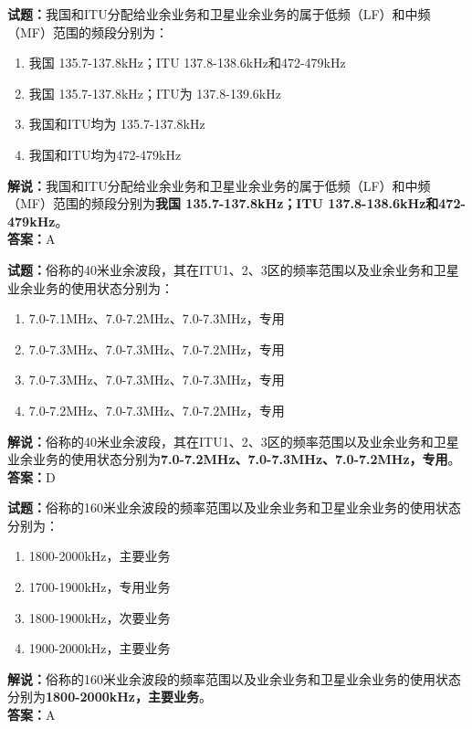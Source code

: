 \documentclass{ctexbook}
\begin{document}
\vspace{\baselineskip}

\noindent\textbf{试题：}我国和ITU分配给业余业务和卫星业余业务的属于低频（LF）和中频（MF）范围的频段分别为：
\begin{enumerate}[leftmargin=3em]
  \item 我国 135.7-137.8\unit{\kHz}；ITU 137.8-138.6\unit{\kHz}和472-479\unit{\kHz}
  \item 我国 135.7-137.8\unit{\kHz}；ITU为 137.8-139.6\unit{\kHz}
  \item 我国和ITU均为 135.7-137.8\unit{\kHz}
  \item 我国和ITU均为472-479\unit{\kHz}
\end{enumerate}
\noindent\textbf{解说：}我国和ITU分配给业余业务和卫星业余业务的属于低频（LF）和中频（MF）范围的频段分别为\textbf{我国 135.7-137.8\unit{\kHz}；ITU 137.8-138.6\unit{\kHz}和472-479\unit{\kHz}}。\\\noindent\textbf{答案：}A

\vspace{\baselineskip}

\noindent\textbf{试题：}俗称的40米业余波段，其在ITU1、2、3区的频率范围以及业余业务和卫星业余业务的使用状态分别为：
\begin{enumerate}[leftmargin=3em]
  \item 7.0-7.1\unit{\MHz}、7.0-7.2\unit{\MHz}、7.0-7.3\unit{\MHz}，专用
  \item 7.0-7.3\unit{\MHz}、7.0-7.3\unit{\MHz}、7.0-7.2\unit{\MHz}，专用
  \item 7.0-7.3\unit{\MHz}、7.0-7.3\unit{\MHz}、7.0-7.3\unit{\MHz}，专用
  \item 7.0-7.2\unit{\MHz}、7.0-7.3\unit{\MHz}、7.0-7.2\unit{\MHz}，专用
\end{enumerate}
\noindent\textbf{解说：}俗称的40米业余波段，其在ITU1、2、3区的频率范围以及业余业务和卫星业余业务的使用状态分别为\textbf{7.0-7.2\unit{\MHz}、7.0-7.3\unit{\MHz}、7.0-7.2\unit{\MHz}，专用}。\\\noindent\textbf{答案：}D

\vspace{\baselineskip}

\noindent\textbf{试题：}俗称的160米业余波段的频率范围以及业余业务和卫星业余业务的使用状态分别为：
\begin{enumerate}[leftmargin=3em]
  \item 1800-2000\unit{\kHz}，主要业务
  \item 1700-1900\unit{\kHz}，专用业务
  \item 1800-1900\unit{\kHz}，次要业务
  \item 1900-2000\unit{\kHz}，主要业务
\end{enumerate}
\noindent\textbf{解说：}俗称的160米业余波段的频率范围以及业余业务和卫星业余业务的使用状态分别为\textbf{1800-2000\unit{\kHz}，主要业务}。\\\noindent\textbf{答案：}A
\end{document}
